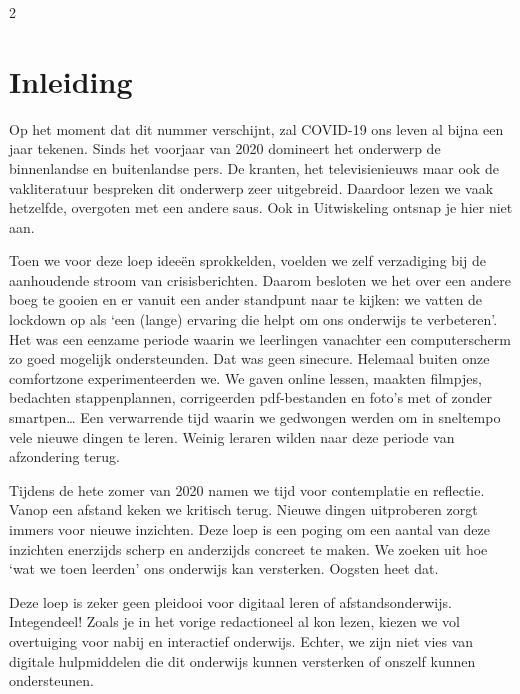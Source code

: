 \begin{multicols}{2}                      
\inhoudstafelLoep		                  %




\section{Inleiding}

Op het moment dat dit nummer verschijnt, zal COVID-19 ons leven al bijna een jaar tekenen. Sinds het voorjaar van 2020 domineert het onderwerp de binnenlandse en buitenlandse pers. De kranten, het televisienieuws maar ook de vakliteratuur bespreken dit onderwerp zeer uitgebreid. Daardoor lezen we vaak hetzelfde, overgoten met een andere saus. Ook in Uitwiskeling ontsnap je hier niet aan.

Toen we voor deze loep ideeën sprokkelden, voelden we zelf verzadiging bij de aanhoudende stroom van crisisberichten. Daarom besloten we het over een andere boeg te gooien en er vanuit een ander standpunt naar te kijken: we vatten de lockdown op als `een (lange) ervaring die helpt om ons onderwijs te verbeteren'. Het was een eenzame periode waarin we leerlingen vanachter een computerscherm zo goed mogelijk ondersteunden. Dat was geen sinecure. Helemaal buiten onze comfortzone experimenteerden we. We gaven online lessen, maakten filmpjes, bedachten stappenplannen, corrigeerden pdf-bestanden en foto’s met of zonder smartpen… Een verwarrende tijd waarin we gedwongen werden om in sneltempo vele nieuwe dingen te leren. Weinig leraren wilden naar deze periode van afzondering terug. 

Tijdens de hete zomer van 2020 namen we tijd voor contemplatie en reflectie. Vanop een afstand keken we kritisch terug. Nieuwe dingen uitproberen zorgt immers voor nieuwe inzichten. Deze loep is een poging om een aantal van deze inzichten enerzijds scherp en anderzijds concreet te maken. We zoeken uit hoe `wat we toen leerden' ons onderwijs kan versterken. Oogsten heet dat.

Deze loep is zeker geen pleidooi voor digitaal leren of afstandsonderwijs. Integendeel! Zoals je in het vorige redactioneel al kon lezen, kiezen we vol overtuiging voor nabij en interactief onderwijs. Echter, we zijn niet vies van digitale hulpmiddelen die dit onderwijs kunnen versterken of onszelf kunnen ondersteunen.


\end{multicols}
